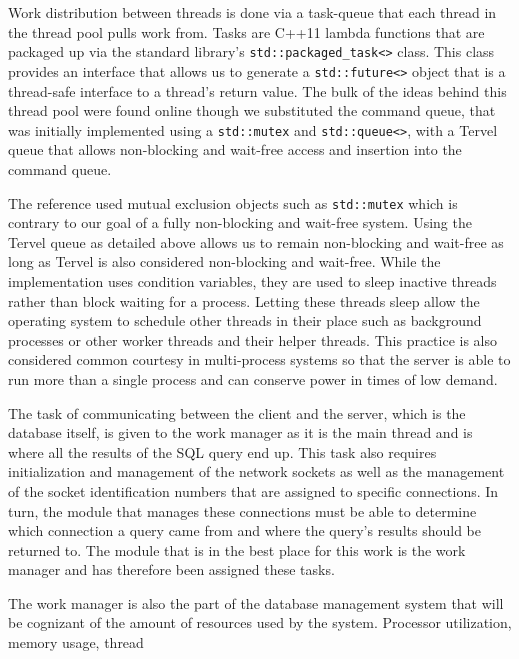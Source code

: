\documentclass[letterpaper, 12pt]{article}
\begin{document}
Work distribution between threads is done via a task-queue that each thread in the
thread pool pulls work from. Tasks are C++11 lambda functions that are packaged up 
via the standard library's \lstinline|std::packaged_task<>|
 class. 
This class provides an interface that allows us to generate a \lstinline|std::future<>| 
object that is a thread-safe interface to a thread's return value. The bulk of the 
ideas behind this thread pool were found online \cite{stackoverflow1} though we substituted
the command queue, that was initially implemented using a \lstinline|std::mutex|
and \lstinline|std::queue<>|, with a Tervel queue that allows
non-blocking and wait-free access and insertion into the command queue.
\par\vspace{\baselineskip}
The reference used mutual exclusion objects such as \lstinline|std::mutex|
which is contrary to our goal of a fully non-blocking and wait-free system. Using the Tervel
queue as detailed above allows us to remain non-blocking and wait-free as long as Tervel
is also considered non-blocking and wait-free. While the implementation uses condition variables,
they are used to sleep inactive threads rather than block waiting for a process. Letting these 
threads sleep allow the operating system to schedule other threads in their place such as 
background processes or other worker threads and their helper threads. This practice is also 
considered common courtesy in multi-process systems so that the server is able to run more than
a single process and can conserve power in times of low demand.
\par\vspace{\baselineskip}
The task of communicating between the client and the server, which is the database itself,
is given to the work manager as it is the main thread and is where all the results of
the SQL query end up. This task also requires initialization and management of the network
sockets as well as the management of the socket identification numbers that are assigned
to specific connections. In turn, the module that manages these connections must be able to
determine which connection a query came from and where the query's results should be
returned to. The module that is in the best place for this work is the work manager
and has therefore been assigned these tasks.
\par\vspace{\baselineskip}
The work manager is also the part of the database management system that will be cognizant
of the amount of resources used by the system. Processor utilization, memory usage, thread
\end{document}
